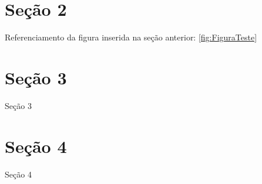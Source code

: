 \section{Seção 2}

Referenciamento da figura inserida na seção anterior: \ref{fig:FiguraTeste}


\section{Seção 3}

Seção 3


\section{Seção 4}

Seção 4
